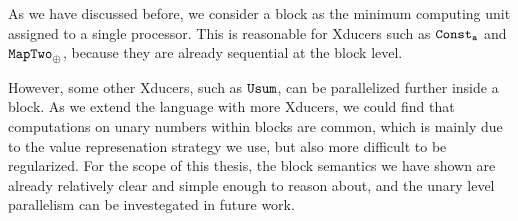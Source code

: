 		


As we have discussed before, we consider a block  as the minimum computing unit assigned to a single processor. This is reasonable for
Xducers such as $\mathtt{Const_{a}}$ and $\mathtt{MapTwo}_{\oplus}$, because
they are already sequential at the block level. 

However, some other Xducers, such as $\mathtt{Usum}$, can be parallelized further inside a block.
As we extend the language with more Xducers, we could find that computations on unary numbers within blocks are common, which is mainly due to the value represenation strategy we use, but also more difficult to be regularized.
For the scope of this thesis, the block semantics we have shown are already relatively clear and simple enough to reason about, and the unary level parallelism can be investegated in future work. 
 
 

%
%
%
%
%
%
%
%
%
%
%
%
%

